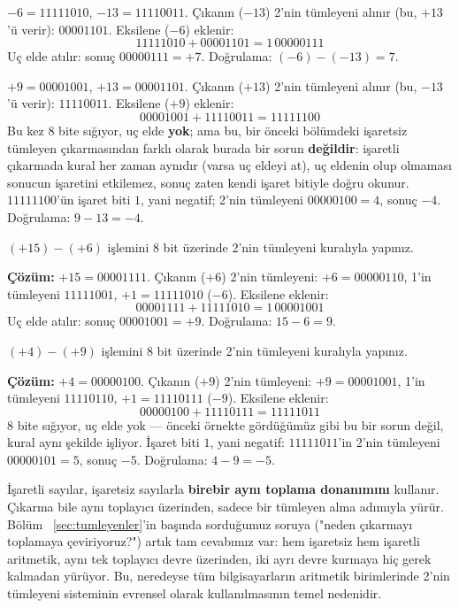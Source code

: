 \begin{ornek}
$-6=11111010$, $-13=11110011$. Çıkanın ($-13$) 2'nin tümleyeni alınır (bu, $+13$'ü verir):
$00001101$. Eksilene ($-6$) eklenir:
\[
11111010+00001101 = 1\,00000111
\]
Uç elde atılır: sonuç $00000111=+7$. Doğrulama: $(-6)-(-13)=7$. \checkmark
\end{ornek}

\begin{ornek}
$+9=00001001$, $+13=00001101$. Çıkanın ($+13$) 2'nin tümleyeni alınır (bu, $-13$'ü verir):
$11110011$. Eksilene ($+9$) eklenir:
\[
00001001+11110011 = 11111100
\]
Bu kez $8$ bite sığıyor, uç elde \textbf{yok}; ama bu, bir önceki bölümdeki işaretsiz
tümleyen çıkarmasından farklı olarak burada bir sorun \textbf{değildir}: işaretli çıkarmada
kural her zaman aynıdır (varsa uç eldeyi at), uç eldenin olup olmaması sonucun işaretini
etkilemez, sonuç zaten kendi işaret bitiyle doğru okunur. $11111100$'ün işaret biti $1$,
yani negatif; 2'nin tümleyeni $00000100=4$, sonuç $-4$. Doğrulama: $9-13=-4$. \checkmark
\end{ornek}

\begin{alistirma}[\kolay]
$(+15)-(+6)$ işlemini $8$ bit üzerinde 2'nin tümleyeni kuralıyla yapınız.
\end{alistirma}

\noindent\textbf{Çözüm:} $+15=00001111$. Çıkanın ($+6$) 2'nin tümleyeni: $+6=00000110$,
1'in tümleyeni $11111001$, $+1=11111010$ ($-6$). Eksilene eklenir:
\[
00001111+11111010 = 1\,00001001
\]
Uç elde atılır: sonuç $00001001=+9$. Doğrulama: $15-6=9$. \checkmark

\begin{alistirma}[\orta]
$(+4)-(+9)$ işlemini $8$ bit üzerinde 2'nin tümleyeni kuralıyla yapınız.
\end{alistirma}

\noindent\textbf{Çözüm:} $+4=00000100$. Çıkanın ($+9$) 2'nin tümleyeni: $+9=00001001$,
1'in tümleyeni $11110110$, $+1=11110111$ ($-9$). Eksilene eklenir:
\[
00000100+11110111 = 11111011
\]
$8$ bite sığıyor, uç elde yok --- önceki örnekte gördüğümüz gibi bu bir sorun değil, kural
aynı şekilde işliyor. İşaret biti $1$, yani negatif: $11111011$'in 2'nin tümleyeni
$00000101=5$, sonuç $-5$. Doğrulama: $4-9=-5$. \checkmark

\begin{bilginot}
İşaretli sayılar, işaretsiz sayılarla \textbf{birebir aynı toplama donanımını} kullanır.
Çıkarma bile aynı toplayıcı üzerinden, sadece bir tümleyen alma adımıyla yürür. Bölüm~
\ref{sec:tumleyenler}'in başında sorduğumuz soruya ("neden çıkarmayı toplamaya
çeviriyoruz?") artık tam cevabımız var: hem işaretsiz hem işaretli aritmetik, aynı tek
toplayıcı devre üzerinden, iki ayrı devre kurmaya hiç gerek kalmadan yürüyor. Bu, neredeyse
tüm bilgisayarların aritmetik birimlerinde 2'nin tümleyeni sisteminin evrensel olarak
kullanılmasının temel nedenidir.
\end{bilginot}

